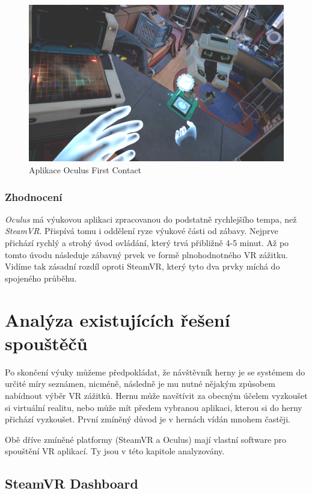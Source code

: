 \begin{figure}[h!]
\centering
\includegraphics[width=12cm]{src/assets/oculus-first-contact.png}
\caption{Aplikace Oculus First Contact}
\end{figure}

\subsubsection{Zhodnocení}\label{zhodnocenuxed-1}

\emph{Oculus} má výukovou aplikaci zpracovanou do podstatně rychlejšího
tempa, než \emph{SteamVR}. Přispívá tomu i oddělení ryze výukové části od zábavy. Nejprve přichází rychlý a strohý úvod ovládání, který trvá
přibližně 4-5 minut. Až po tomto úvodu následuje zábavný prvek
ve formě plnohodnotného VR zážitku. Vidíme tak zásadní rozdíl oproti
SteamVR, který tyto dva prvky míchá do spojeného průběhu.

\section{Analýza existujících řešení
spouštěčů}\label{analuxfdza-existujuxedcuxedch-ux159eux161enuxed-spouux161tux11bux10dux16f}

Po skončení výuky můžeme předpokládat, že návštěvník herny je se
systémem do určité míry seznámen, nicméně, následně je mu nutné nějakým způsobem
nabídnout výběr VR zážitků. Hernu může navštívit za obecným účelem vyzkoušet si virtuální realitu, nebo může mít předem vybranou aplikaci, kterou si do herny přichází vyzkoušet. První
zmíněný důvod je v hernách vídán mnohem častěji.

Obě dříve zmíněné platformy (SteamVR a Oculus) mají
vlastní software pro spouštění VR aplikací. Ty jsou v této kapitole
analyzovány.

\subsection{SteamVR Dashboard}\label{steamvr-dashboard}


